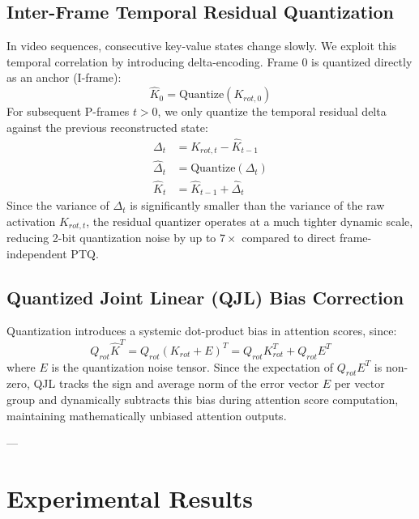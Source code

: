 \documentclass[10pt,twocolumn,letterpaper]{article}
\begin{document}
\subsection{Inter-Frame Temporal Residual Quantization}
In video sequences, consecutive key-value states change slowly. We exploit this temporal correlation by introducing delta-encoding. Frame 0 is quantized directly as an anchor (I-frame):
\begin{equation}
    \hat{K}_0 = \text{Quantize}(K_{rot, 0})
\end{equation}
For subsequent P-frames $t > 0$, we only quantize the temporal residual delta against the previous reconstructed state:
\begin{align}
    \Delta_t &= K_{rot, t} - \hat{K}_{t-1} \\
    \hat{\Delta}_t &= \text{Quantize}(\Delta_t) \\
    \hat{K}_t &= \hat{K}_{t-1} + \hat{\Delta}_t
\end{align}
Since the variance of $\Delta_t$ is significantly smaller than the variance of the raw activation $K_{rot, t}$, the residual quantizer operates at a much tighter dynamic scale, reducing 2-bit quantization noise by up to $7\times$ compared to direct frame-independent PTQ.

\subsection{Quantized Joint Linear (QJL) Bias Correction}
Quantization introduces a systemic dot-product bias in attention scores, since:
\begin{equation}
    Q_{rot} \hat{K}^T = Q_{rot} (K_{rot} + E)^T = Q_{rot} K_{rot}^T + Q_{rot} E^T
\end{equation}
where $E$ is the quantization noise tensor. Since the expectation of $Q_{rot} E^T$ is non-zero, QJL tracks the sign and average norm of the error vector $E$ per vector group and dynamically subtracts this bias during attention score computation, maintaining mathematically unbiased attention outputs.

---

\section{Experimental Results}
\end{document}
